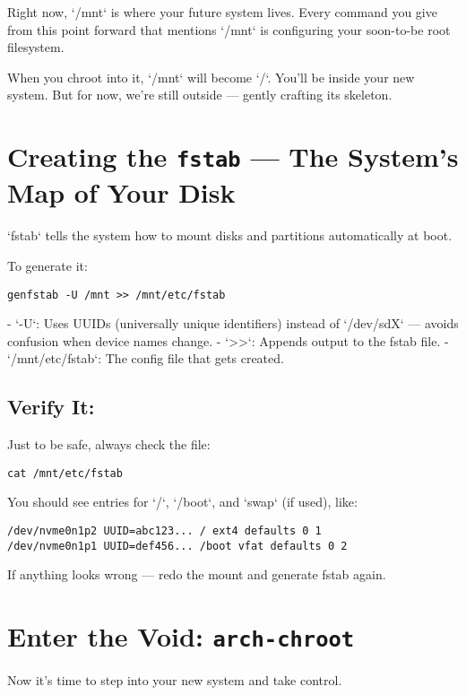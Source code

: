 \documentclass[12pt,openany]{book}
\begin{document}
Right now, `/mnt` is where your future system lives. Every command you give from this point forward that mentions `/mnt` is configuring your soon-to-be root filesystem.

When you chroot into it, `/mnt` will become `/`. You’ll be inside your new system. But for now, we’re still outside — gently crafting its skeleton.

\section{Creating the \texttt{fstab} — The System's Map of Your Disk}

`fstab` tells the system how to mount disks and partitions automatically at boot.

To generate it:

\begin{lstlisting}
genfstab -U /mnt >> /mnt/etc/fstab
\end{lstlisting}

- `-U`: Uses UUIDs (universally unique identifiers) instead of `/dev/sdX` — avoids confusion when device names change.
- `>>`: Appends output to the fstab file.
- `/mnt/etc/fstab`: The config file that gets created.

\subsection*{Verify It:}

Just to be safe, always check the file:

\begin{lstlisting}
cat /mnt/etc/fstab
\end{lstlisting}

You should see entries for `/`, `/boot`, and `swap` (if used), like:

\begin{lstlisting}
/dev/nvme0n1p2 UUID=abc123... / ext4 defaults 0 1
/dev/nvme0n1p1 UUID=def456... /boot vfat defaults 0 2
\end{lstlisting}

If anything looks wrong — redo the mount and generate fstab again.

\section{Enter the Void: \texttt{arch-chroot}}

Now it’s time to step into your new system and take control.
\end{document}
